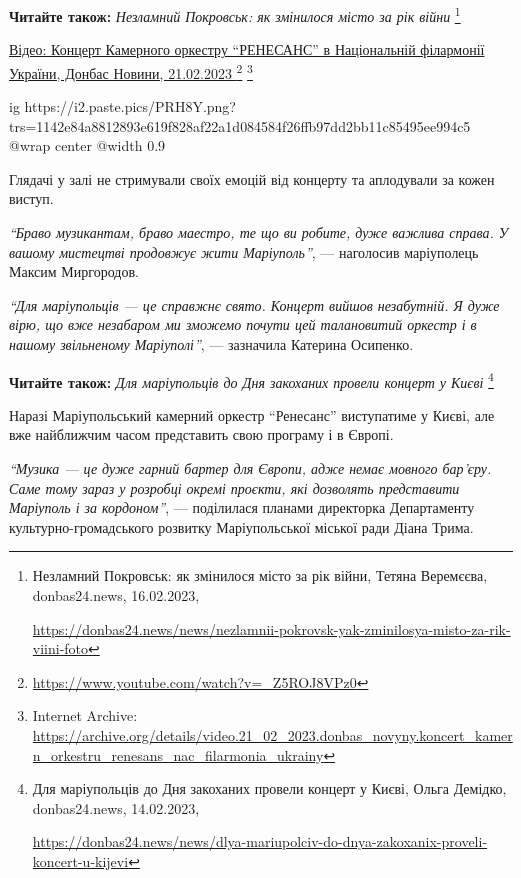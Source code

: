 \textbf{Читайте також:} \emph{Незламний Покровськ: як змінилося місто за рік війни}%
\footnote{Незламний Покровськ: як змінилося місто за рік війни, Тетяна Веремєєва, donbas24.news, 16.02.2023, \par%
\url{https://donbas24.news/news/nezlamnii-pokrovsk-yak-zminilosya-misto-za-rik-viini-foto}%
}

\href{https://archive.org/details/video.21_02_2023.donbas_novyny.koncert_kamern_orkestru_renesans_nac_filarmonia_ukrainy}{%
Відео: Концерт Камерного оркестру \enquote{РЕНЕСАНС} в Національній філармонії України, Донбас Новини, 21.02.2023%
}%
\footnote{\url{https://www.youtube.com/watch?v=_Z5ROJ8VPz0}} %
\footnote{Internet Archive: \url{https://archive.org/details/video.21_02_2023.donbas_novyny.koncert_kamern_orkestru_renesans_nac_filarmonia_ukrainy}}

\ifcmt
  ig https://i2.paste.pics/PRH8Y.png?trs=1142e84a8812893e619f828af22a1d084584f26ffb97dd2bb11c85495ee994c5
  @wrap center
  @width 0.9
\fi

Глядачі у залі не стримували своїх емоцій від концерту та аплодували за кожен виступ.

\begin{leftbar}
\emph{\enquote{Браво музикантам, браво маестро, те що ви робите, дуже важлива справа. У
вашому мистецтві продовжує жити Маріуполь}}, — наголосив маріуполець
Максим Миргородов.
\end{leftbar}

\begin{leftbar}
\emph{\enquote{Для маріупольців — це справжнє свято. Концерт вийшов незабутній. Я дуже вірю,
що вже незабаром ми зможемо почути цей талановитий оркестр і в нашому
звільненому Маріуполі}}, — зазначила Катерина Осипенко.
\end{leftbar}

\textbf{Читайте також:} \emph{Для маріупольців до Дня закоханих провели концерт у Києві}%
\footnote{Для маріупольців до Дня закоханих провели концерт у Києві, Ольга Демідко, donbas24.news, 14.02.2023, \par%
\url{https://donbas24.news/news/dlya-mariupolciv-do-dnya-zakoxanix-proveli-koncert-u-kijevi}%
}


Наразі Маріупольський камерний оркестр \enquote{Ренесанс} виступатиме у Києві, але вже
найближчим часом представить свою програму і в Європі.

\begin{leftbar}
\emph{\enquote{Музика — це дуже гарний бартер для Європи, адже немає мовного бар'єру. Саме
тому зараз у розробці окремі проєкти, які дозволять представити
Маріуполь і за кордоном}}, — поділилася планами директорка Департаменту
культурно-громадського розвитку Маріупольської міської ради Діана
Трима.
\end{leftbar}

